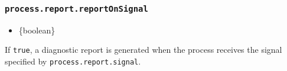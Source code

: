 \begin{Shaded}
\begin{Highlighting}[]
\OperatorTok{=} \NormalTok{(}\NormalTok{)}\OperatorTok{;}

\NormalTok{(}\SpecialCharTok{$\{}\SpecialCharTok{\}}\VerbatimStringTok{\textasciigrave{}}\NormalTok{)}\OperatorTok{;}
\end{Highlighting}
\end{Shaded}

\subsubsection{\texorpdfstring{\texttt{process.report.reportOnSignal}}{process.report.reportOnSignal}}\label{process.report.reportonsignal}

\begin{itemize}
\tightlist
\item
  \{boolean\}
\end{itemize}

If \texttt{true}, a diagnostic report is generated when the process
receives the signal specified by \texttt{process.report.signal}.

\begin{Shaded}
\begin{Highlighting}[]
 \OperatorTok{;}

\NormalTok{(}\SpecialCharTok{$\{}\SpecialCharTok{\}}\VerbatimStringTok{\textasciigrave{}}\NormalTok{)}\OperatorTok{;}
\end{Highlighting}
\end{Shaded}

\begin{Shaded}
\begin{Highlighting}[]
\OperatorTok{=} \NormalTok{(}\NormalTok{)}\OperatorTok{;}

\NormalTok{(}\SpecialCharTok{$\{}\SpecialCharTok{\}}\VerbatimStringTok{\textasciigrave{}}\NormalTok{)}\OperatorTok{;}
\end{Highlighting}
\end{Shaded}

